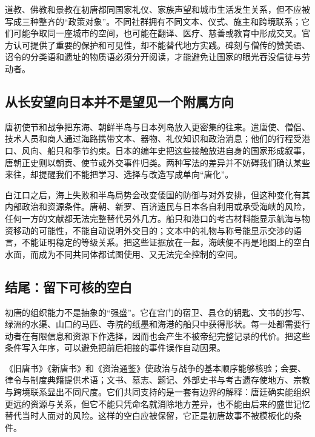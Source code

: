 道教、佛教和景教在初唐都同国家礼仪、家族声望和城市生活发生关系，但不应被写成三种整齐的“政策对象”。不同社群拥有不同文本、仪式、施主和跨境联系；它们可能争取同一座城市的空间，也可能在翻译、医疗、慈善或教育中形成交叉。官方认可提供了重要的保护和可见性，却不能替代地方实践。碑刻与僧传的赞美语、诏令的分类语和遗址的物质语必须分开阅读，才能避免让国家的眼光吞没信徒与劳动者。

\subsection{从长安望向日本并不是望见一个附属方向}
唐初使节和战争把东海、朝鲜半岛与日本列岛放入更密集的往来。遣唐使、僧侣、技术人员和商人通过海路携带文本、器物、礼仪知识和政治消息；他们的行程受港口、风向、船只和季节约束。日本的编年史把这些接触放进自身的国家形成叙事，唐朝正史则以朝贡、使节或外交事件归类。两种写法的差异并不妨碍我们确认某些来往，却提醒我们不能把学习、选择与改造写成单向“唐化”。

白江口之后，海上失败和半岛局势会改变倭国的防御与对外安排，但这种变化有其内部政治和资源条件。唐朝、新罗、百济遗民与日本各自利用或承受海峡的风险，任何一方的文献都无法完整替代另外几方。船只和港口的考古材料能显示航海与物资移动的可能性，不能自动说明外交目的；文本中的礼物与称号能显示交涉的语言，不能证明稳定的等级关系。把这些证据放在一起，海峡便不再是地图上的空白水面，而成为不同共同体都试图使用、又无法完全控制的空间。

\subsection{结尾：留下可核的空白}
初唐的组织能力不是抽象的“强盛”。它在宫门的宿卫、县仓的钥匙、文书的抄写、绿洲的水渠、山口的马匹、寺院的纸墨和海港的船只中获得形状。每一处都需要行动者在有限信息和资源下作选择，因而也会产生不被帝纪完整记录的代价。把这些条件写入年序，可以避免把前后相接的事件误作自动因果。

《旧唐书》《新唐书》和《资治通鉴》使政治与战争的基本顺序能够核验；会要、律令与制度典籍提供术语；文书、墓志、题记、外部史书与考古遗存使地方、宗教与跨境联系显出不同尺度。它们共同支持的是一套有边界的解释：唐廷确实能组织更远的资源与关系，但它不能只凭命名就消除地方差异，也不能由后来的盛世记忆替代当时人面对的风险。这样的空白应被保留，它正是初唐故事不被模板化的条件。
